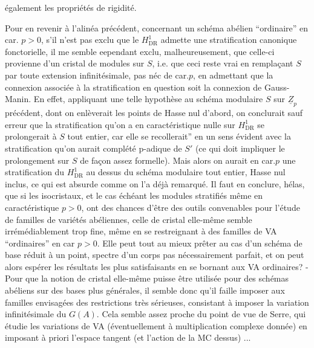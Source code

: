 également les propriétés de rigidité.\inserted{]}

Pour en revenir à l'alinéa précédent, concernant un schéma abélien ``ordinaire'' en car. $p>0$, s'il n'est pas exclu que le $H^1_{\operatorname{DR}}$ admette une stratification canonique fonctorielle, il me semble eependant exclu, malheureusement, que celle-ci provienne d'un cristal  de modules sur $S$, i.e. que ceci reste vrai en remplaçant $S$ par toute extension infinitésimale, pas néc de car.$p$,  en admettant que la connexion associée à la stratification en question soit la connexion de Gauss-Manin\inserted{)}. En effet, appliquant une telle hypothèse au schéma modulaire $S$ sur $\underline{Z}_p$ précédent, dont on enlèverait les points de Hasse nul d'abord, on conclurait sauf erreur que  la stratification qu'on a en caractéristique nulle sur $H^1_{\operatorname{DR}}$ se prolongerait à $S$ tout entier, car elle se recollerait'' en un sens évident avec la  stratification qu'on aurait   complété p-adique de $S'$ (ce qui doit impliquer le prolongement sur $S$ de façon assez formelle). Mais alors on aurait en car.$p$ une stratification du $H^1_{\operatorname{DR}}$ au dessus du schéma modulaire tout entier, Hasse nul inclus, ce qui est absurde comme on l'a déjà remarqué. Il faut en conclure, hélas, que si les isocristaux, et le cas échéant les modules stratifiés même en caractéristique  $p>0$, ont des chances d'être des outils convenables pour l'étude de familles de variétés abéliennes, celle de cristal elle-même semble irrémédiablement trop fine, même en se restreignant à des familles de VA ``ordinaires'' en car $p>0$. Elle peut tout au mieux  prêter au cas d'un schéma de base réduit à un point, spectre d'un corps pas nécessairement parfait, et on peut alors espérer les résultats les plus satisfaisants en se bornant aux VA ordinaires? - Pour que la notion de cristal elle-même puisse être utilisée pour des schémas abéliens sur des bases plus générales, il semble donc qu'il faille imposer aux familles envisagées des restrictions très sérieuses, consistant à imposer la variation infinitésimale du $G(A)$. Cela semble assez proche du point de vue de Serre, qui étudie les variations de VA (éventuellement à multiplication complexe donnée) en imposant à priori l'espace tangent (et l'action de la MC dessus) ...
